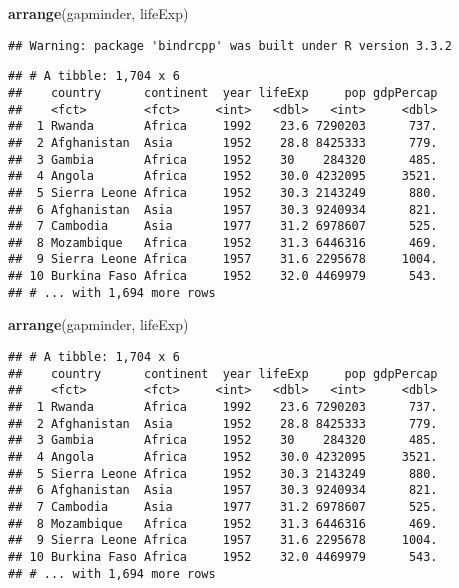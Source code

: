 \documentclass[]{article}
\newenvironment{Shaded}{\begin{snugshade}}{\end{snugshade}}
\newcommand{\KeywordTok}[1]{\textcolor[rgb]{0.13,0.29,0.53}{\textbf{{#1}}}}
\newcommand{\NormalTok}[1]{{#1}}
\begin{document}
\begin{Shaded}
\begin{Highlighting}[]
\KeywordTok{arrange}\NormalTok{(gapminder, lifeExp)}
\end{Highlighting}
\end{Shaded}

\begin{verbatim}
## Warning: package 'bindrcpp' was built under R version 3.3.2
\end{verbatim}

\begin{verbatim}
## # A tibble: 1,704 x 6
##    country      continent  year lifeExp     pop gdpPercap
##    <fct>        <fct>     <int>   <dbl>   <int>     <dbl>
##  1 Rwanda       Africa     1992    23.6 7290203      737.
##  2 Afghanistan  Asia       1952    28.8 8425333      779.
##  3 Gambia       Africa     1952    30    284320      485.
##  4 Angola       Africa     1952    30.0 4232095     3521.
##  5 Sierra Leone Africa     1952    30.3 2143249      880.
##  6 Afghanistan  Asia       1957    30.3 9240934      821.
##  7 Cambodia     Asia       1977    31.2 6978607      525.
##  8 Mozambique   Africa     1952    31.3 6446316      469.
##  9 Sierra Leone Africa     1957    31.6 2295678     1004.
## 10 Burkina Faso Africa     1952    32.0 4469979      543.
## # ... with 1,694 more rows
\end{verbatim}

\begin{Shaded}
\begin{Highlighting}[]
\KeywordTok{arrange}\NormalTok{(gapminder, lifeExp)}
\end{Highlighting}
\end{Shaded}

\begin{verbatim}
## # A tibble: 1,704 x 6
##    country      continent  year lifeExp     pop gdpPercap
##    <fct>        <fct>     <int>   <dbl>   <int>     <dbl>
##  1 Rwanda       Africa     1992    23.6 7290203      737.
##  2 Afghanistan  Asia       1952    28.8 8425333      779.
##  3 Gambia       Africa     1952    30    284320      485.
##  4 Angola       Africa     1952    30.0 4232095     3521.
##  5 Sierra Leone Africa     1952    30.3 2143249      880.
##  6 Afghanistan  Asia       1957    30.3 9240934      821.
##  7 Cambodia     Asia       1977    31.2 6978607      525.
##  8 Mozambique   Africa     1952    31.3 6446316      469.
##  9 Sierra Leone Africa     1957    31.6 2295678     1004.
## 10 Burkina Faso Africa     1952    32.0 4469979      543.
## # ... with 1,694 more rows
\end{verbatim}
\end{document}
